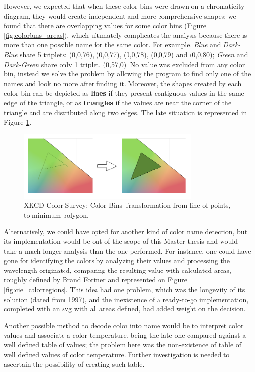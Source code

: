 %
However, we expected that when these color bins were drawn on a chromaticity diagram, they would create independent and more comprehensive shapes: we found that there are overlapping
values for some color bins (Figure \ref{fig:colorbins_areas}), which ultimately complicates the analysis because there is more than one possible name for the same color. For example, \emph{Blue} and \emph{Dark-Blue}
share 5 triplets: (0,0,76), (0,0,77), (0,0,78), (0,0,79) and (0,0,80); \emph{Green} and \emph{Dark-Green} share only 1 triplet, (0,57,0). No value was excluded from any color bin,
instead we solve the problem by allowing the program to find only one of the names and look no more after finding it. Moreover, the shapes created by each color bin can be depicted as \textbf{lines}
if they present contiguous values in the same edge of the triangle, or as \textbf{triangles} if the values are near the corner of the triangle and are distributed along two edges. The late situation is
represented in Figure \ref{fig:colorbins_triangle}.
%
\begin{figure}
  \centering
  \includegraphics[width=0.8\textwidth]{images/results/colorbins_transformation.png}
  \caption[XKCD Color Survey: Color Bins Transformation]{XKCD Color Survey: Color Bins Transformation from line of points, to minimum polygon.}
  \label{fig:colorbins_triangle}
\end{figure} \par
%
Alternatively, we could have opted for another kind of color name detection, but its implementation would be out of the scope of this Master thesis and would take a much longer
analysis than the one performed. For instance, one could have gone for identifying the colors by analyzing their values and processing the wavelength originated, comparing the resulting
value with calculated areas, roughly defined by Brand Fortner \cite{Fortner1997} and represented on Figure \ref{fig:cie_colorregions}. This idea had one problem, which was the longevity
of its solution (dated from 1997), and the inexistence of a ready-to-go implementation, completed with an svg with all areas defined, had added weight on the decision. \par
%
Another possible method to decode color into name would be to interpret color values and associate a color temperature, being the late one compared against a well defined table
of values; the problem here was the non-existence of table of well defined values of color temperature. Further investigation is needed to ascertain the possibility of creating such table.
%

